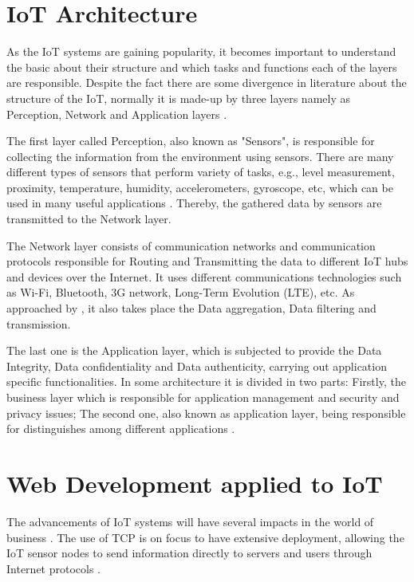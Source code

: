 \section{IoT Architecture}

As the \gls{IoT} systems are gaining popularity, it becomes important to understand the basic about their structure and which tasks and functions each of the layers are responsible. Despite the fact there are some divergence in literature about the structure of the \gls{IoT}, normally it is made-up by three layers namely as Perception, Network and Application layers \cite{SWAMY:2017}. 

The first layer called Perception, also known as "Sensors", is responsible for collecting the information from the environment using sensors. There are many different types of sensors that perform variety of tasks, e.g., level measurement, proximity, temperature, humidity, accelerometers, gyroscope, etc, which can be used in many useful applications \cite{ALOTAIBI:2016}. Thereby, the gathered data by sensors are  transmitted to the Network layer. 

The Network layer consists of communication networks and communication protocols responsible for Routing and Transmitting the data to different \gls{IoT} hubs and devices over the Internet. It uses different communications technologies such as Wi-Fi, Bluetooth, 3G network, Long-Term Evolution (LTE), etc. As approached by \cite{SWAMY:2017}, it also takes place the Data aggregation, Data filtering and transmission.

The last one is the Application layer, which is subjected to provide the Data Integrity, Data confidentiality and Data authenticity, carrying out application specific functionalities. In some architecture it is divided in two parts: Firstly, the business layer which is responsible for application management and security and privacy issues; The second one, also known as application layer, being responsible for distinguishes among different applications \cite{TEWARI:2018}. 


\section{Web Development applied to IoT}

The advancements of \gls{IoT} systems will have several impacts in the world of business \cite{TURC:2019}. The use of \gls{TCP} is on focus to have extensive deployment, allowing the \gls{IoT} sensor nodes to send information directly to servers and users through Internet protocols \cite{HART:2015}.


